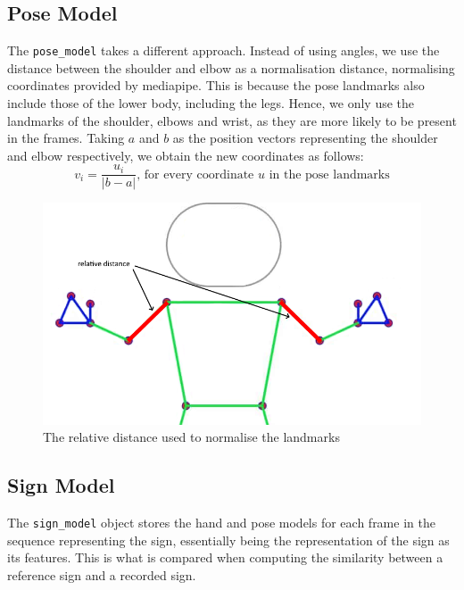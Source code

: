 \documentclass[final,rdr32.tex]{subfiles}
\begin{document}
\subsection{Pose Model}
\label{sec:pose_model}

The \verb|pose_model| takes a different approach. Instead of using angles, we use the distance between the shoulder and elbow as a normalisation distance, normalising coordinates provided by mediapipe. This is because the pose landmarks also include those of the lower body, including the legs. Hence, we only use the landmarks of the shoulder, elbows and wrist, as they are more likely to be present in the frames. Taking $a$ and $b$ as the position vectors representing the shoulder and elbow respectively, we obtain the new coordinates as follows:
\begin{equation*}
    v_i = \frac{u_i}{|b - a|} \text{, for every coordinate $u$ in the pose landmarks}
\end{equation*}

\begin{figure}
    \begin{center}
        \includegraphics[width=\textwidth]{images/pose.png}
        \caption{The relative distance used to normalise the landmarks}
    \end{center}
\end{figure}

\subsection{Sign Model}
\label{sec:sign_model}

The \verb|sign_model| object stores the hand and pose models for each frame in the sequence representing the sign, essentially being the representation of the sign as its features. This is what is compared when computing the similarity between a reference sign and a recorded sign.
\end{document}
